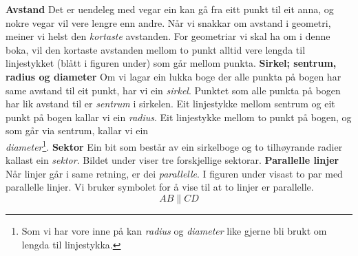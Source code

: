 \newpage
{}
\newpage
\textbf{Avstand}\os
Det er uendeleg med vegar ein kan gå fra eitt punkt til eit anna, og nokre vegar vil vere lengre enn andre. Når vi snakkar om avstand i geometri, meiner vi helst den \textsl{kortaste} avstanden. For geometriar vi skal ha om i denne boka, vil den kortaste avstanden mellom to punkt alltid vere lengda til linjestykket (blått i figuren under) som går mellom punkta.
\textbf{Sirkel; sentrum, radius og diameter} \os
Om vi lagar ein lukka boge der alle punkta på bogen har same avstand til eit punkt, har vi ein \textit{sirkel}. Punktet som alle punkta på bogen har lik avstand til er \textit{sentrum} i sirkelen. Eit linjestykke mellom sentrum og eit punkt på bogen kallar vi ein \textit{radius}. Eit linjestykke mellom to punkt på bogen, og som går via sentrum, kallar vi ein\\ \textit{diameter}\footnote{Som vi har vore inne på kan \textit{radius} og \textit{diameter} like gjerne bli brukt om lengda til linjestykka.}.
\textbf{Sektor} \os
Ein bit som består av ein sirkelboge og to tilhøyrande radier kallast ein \textit{sektor}. Bildet under viser tre forskjellige sektorar.
\newpage
\textbf{Parallelle linjer}\os
Når linjer går i same retning, er dei \textit{parallelle}. I figuren under visast to par med parallelle linjer.
Vi bruker symbolet \sym{$ \parallel $} for å vise til at to linjer er parallelle.
\[ AB\parallel CD \]

